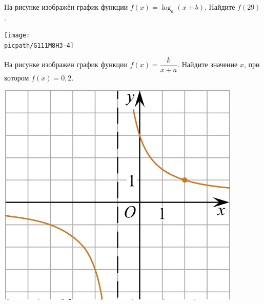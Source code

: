 \begin{homework}[number=3]
\begin{listofex}
\begin{minipage}[t]{0.65\linewidth}
			На рисунке изображён график функции \(f(x)=\log_{a}(x+b)\). Найдите \(f(29)\).
		\end{minipage}
		\begin{minipage}[t]{0.32\linewidth}
			\texttt{[image: \\picpath/G111M8H3-4]}
		\end{minipage}
		\item
		\begin{minipage}[t]{0.63\linewidth}
			На рисунке изображен график функции \(f(x)=\dfrac{ k }{ x+a }\). Найдите значение \(x\), при котором \(f(x)=0,2\).
		\end{minipage}
		\hspace{0.02\linewidth}
		\begin{minipage}[t]{0.32\linewidth}
			\includegraphics[align=t, width=\linewidth]{../pics/G112M8H3-2}
		\end{minipage}
	\end{listofex}
\end{homework}


